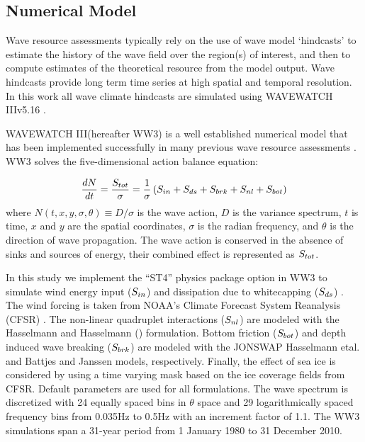 \subsection{Numerical Model} \label{sec:method:model}

Wave resource assessments typically rely on the use of wave model `hindcasts' to estimate the history of the wave field over the region(s) of interest, and then to compute estimates of the theoretical resource from the model output. Wave hindcasts provide long term time series at high spatial and temporal resolution. In this work all wave climate hindcasts are simulated using WAVEWATCH III\textregistered v5.16 \citep{tolmanDistributedmemoryConceptsWave2002,tolmanwavewatch}.

WAVEWATCH III\textregistered (hereafter WW3) is a  well established numerical model that has been implemented successfully in many previous wave resource assessments \citep[e.g.,][]{garcia-medinaWaveResourceAssessment2014,hemerRevisedAssessmentAustralia2017,yangWaveModelTest2017}.
WW3 solves the five-dimensional action balance equation:

\begin{align}
  \frac{d N}{d t} = \frac{S_{ tot }}{\sigma} = \frac{1}{\sigma}\left ( S_{ in } + S_{ ds } + S_{ brk } + S_{ nl } + S_{ bot } \right )
  \label{eqn:actionbalance}
\end{align}
where $N(t,x,y,\sigma,\theta) \equiv D/\sigma$ is the wave action, $D$ is the variance spectrum, $t$ is time, $x$ and $y$ are the spatial coordinates, $\sigma$ is the radian frequency, and $\theta$ is the direction of wave propagation.
The wave action is conserved in the absence of sinks and sources of energy, their combined effect is represented as $S_{ tot }$.

In this study we implement the ``ST4'' physics package option in WW3 to simulate wind energy input ($S_{ in }$) and dissipation due to whitecapping ($S_{ ds }$) \citep{ardhuinObservationSwellDissipation2009}.
The wind forcing is taken from NOAA's Climate Forecast System Reanalysis (CFSR) \citep{sahaNCEPClimateForecast2010}. The non-linear quadruplet interactions ($S_{ nl }$) are modeled with the Hasselmann and Hasselmann (\citeyear{hasselmannComputationsParameterizationsNonlinear1985}) formulation. Bottom friction ($S_{ bot }$) and depth induced wave breaking ($S_{ brk }$) are modeled with the JONSWAP Hasselmann etal. \citeyear{hasselmannMeasurementsWindwaveGrowth1973} and Battjes and Janssen \citeyear{battjesEnergyLossSetup1978} models, respectively. Finally, the effect of sea ice is considered by using a time varying mask based on the ice coverage fields from CFSR. Default parameters are used for all formulations. The wave spectrum is discretized with 24 equally spaced bins in $\theta$ space and 29 logarithmically spaced frequency bins from 0.035Hz to 0.5Hz with an increment factor of 1.1. The WW3 simulations span a 31-year period from 1 January 1980 to 31 December 2010.

